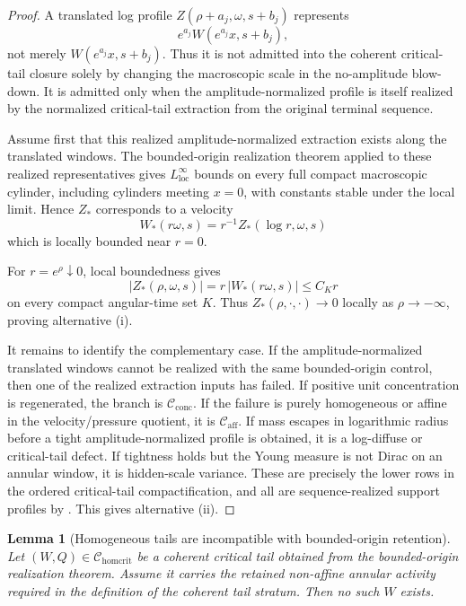 \documentclass[11pt]{amsart}
\numberwithin{equation}{section}
\theoremstyle{plain}
\newtheorem{lemma}[lemma]{Lemma}
\theoremstyle{definition}
\theoremstyle{remark}
\newcommand{\loc}{\mathrm{loc}}
\newcommand{\Cactive}{\mathcal C_{\mathrm{conc}}}
\newcommand{\Caff}{\mathcal C_{\mathrm{aff}}}
\newcommand{\Chomcrit}{\mathcal C_{\mathrm{homcrit}}}
\begin{document}
\begin{proof}
A translated log profile \(Z(\rho+a_j,\omega,s+b_j)\) represents
\[
   e^{a_j}W(e^{a_j}x,s+b_j),
\]
not merely \(W(e^{a_j}x,s+b_j)\).  Thus it is not admitted into the coherent
critical-tail closure solely by changing the macroscopic scale in the
no-amplitude blow-down.  It is admitted only when the amplitude-normalized
profile is itself realized by the normalized critical-tail extraction from the
original terminal sequence.

Assume first that this realized amplitude-normalized extraction exists along
the translated windows.  The bounded-origin realization theorem applied to
these realized representatives gives \(L^\infty_{\loc}\) bounds on every full
compact macroscopic cylinder, including cylinders meeting \(x=0\), with
constants stable under the local limit.  Hence \(Z_*\) corresponds to a
velocity
\[
   W_*(r\omega,s)=r^{-1}Z_*(\log r,\omega,s)
\]
which is locally bounded near \(r=0\).

For \(r=e^\rho\downarrow0\), local boundedness gives
\[
   |Z_*(\rho,\omega,s)|
   =
   r\,|W_*(r\omega,s)|
   \le C_K r
\]
on every compact angular-time set \(K\).  Thus
\(Z_*(\rho,\cdot,\cdot)\to0\) locally as \(\rho\to-\infty\), proving
alternative \textup{(i)}.

It remains to identify the complementary case.  If the
amplitude-normalized translated windows cannot be realized with the same
bounded-origin control, then one of the realized extraction inputs has failed.
If positive unit concentration is regenerated, the branch is \(\Cactive\).  If
the failure is purely homogeneous or affine in the velocity/pressure quotient,
it is \(\Caff\).  If mass escapes in logarithmic radius before a tight
amplitude-normalized profile is obtained, it is a log-diffuse or critical-tail
defect.  If tightness holds but the Young measure is not Dirac on an annular
window, it is hidden-scale variance.  These are precisely the lower rows in the
ordered critical-tail compactification, and all are sequence-realized support
profiles by .
This gives alternative \textup{(ii)}.
\end{proof}

\begin{lemma}[Homogeneous tails are incompatible with bounded-origin retention]
\label{lem:homogeneous-tail-bounded-origin-closure}
Let \((W,Q)\in\Chomcrit\) be a coherent critical tail obtained from the
bounded-origin realization theorem.  Assume it carries the retained non-affine
annular activity required in the definition of the coherent tail stratum.  Then
no such \(W\) exists.
\end{lemma}
\end{document}
